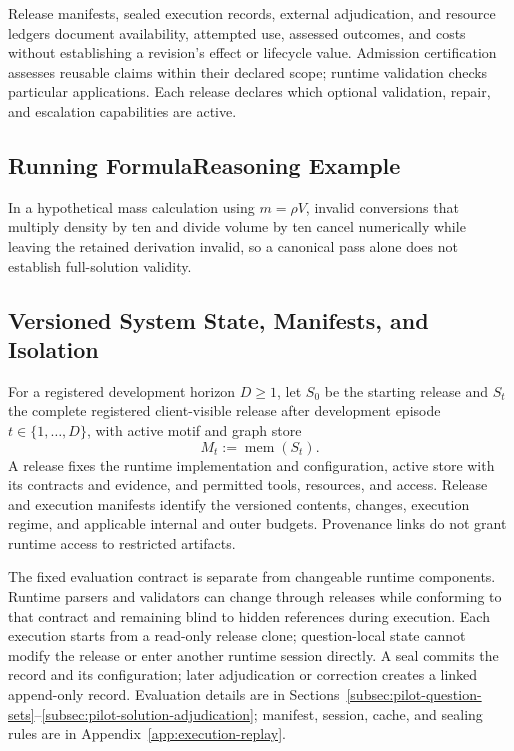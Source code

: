 \documentclass[10pt]{article} %
\providecommand{\1}{\mathbf{1}}  %
\theoremstyle{remark}
\theoremstyle{definition}
\begin{document}
Release manifests, sealed execution records, external adjudication, and
resource ledgers document availability, attempted use, assessed outcomes,
and costs without establishing a revision's effect or lifecycle value.
Admission certification assesses reusable claims within their declared
scope; runtime validation checks particular applications. Each release
declares which optional validation, repair, and escalation capabilities
are active.

\subsection{Running FormulaReasoning Example}
\label{subsec:courtroom-example}

In a hypothetical mass calculation using $m=\rho V$, invalid conversions
that multiply density by ten and divide volume by ten cancel numerically
while leaving the retained derivation invalid, so a canonical pass alone
does not establish full-solution validity.

\subsection{Versioned System State, Manifests, and Isolation}
\label{subsec:courtroom-state}

For a registered development horizon $D\geq1$, let $S_0$ be the starting
release and $S_t$ the complete registered client-visible release after
development episode $t\in\{1,\ldots,D\}$, with active motif and graph store
\[
M_t:=\operatorname{mem}(S_t).
\]
A release fixes the runtime implementation and configuration, active store
with its contracts and evidence, and permitted tools, resources, and
access. Release and execution manifests identify the versioned contents,
changes, execution regime, and applicable internal and outer budgets.
Provenance links do not grant runtime access to restricted artifacts.

The fixed evaluation contract is separate from changeable runtime
components. Runtime parsers and validators can change through releases
while conforming to that contract and remaining blind to hidden
references during execution. Each execution starts from a read-only
release clone; question-local state cannot modify the release or enter
another runtime session directly. A seal commits the record and its
configuration; later adjudication or correction creates a linked
append-only record. Evaluation details are in
Sections~\ref{subsec:pilot-question-sets}--\ref{subsec:pilot-solution-adjudication};
manifest, session, cache, and sealing rules are in
Appendix~\ref{app:execution-replay}.
\end{document}

